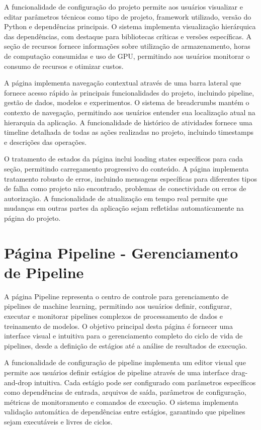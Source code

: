 \documentclass[12pt,a4paper]{article}
\begin{document}
A funcionalidade de configuração do projeto permite aos usuários visualizar e editar parâmetros técnicos como tipo de projeto, framework utilizado, versão do Python e dependências principais. O sistema implementa visualização hierárquica das dependências, com destaque para bibliotecas críticas e versões específicas. A seção de recursos fornece informações sobre utilização de armazenamento, horas de computação consumidas e uso de GPU, permitindo aos usuários monitorar o consumo de recursos e otimizar custos.

A página implementa navegação contextual através de uma barra lateral que fornece acesso rápido às principais funcionalidades do projeto, incluindo pipeline, gestão de dados, modelos e experimentos. O sistema de breadcrumbs mantém o contexto de navegação, permitindo aos usuários entender sua localização atual na hierarquia da aplicação. A funcionalidade de histórico de atividades fornece uma timeline detalhada de todas as ações realizadas no projeto, incluindo timestamps e descrições das operações.

O tratamento de estados da página inclui loading states específicos para cada seção, permitindo carregamento progressivo do conteúdo. A página implementa tratamento robusto de erros, incluindo mensagens específicas para diferentes tipos de falha como projeto não encontrado, problemas de conectividade ou erros de autorização. A funcionalidade de atualização em tempo real permite que mudanças em outras partes da aplicação sejam refletidas automaticamente na página do projeto.

\section{Página Pipeline - Gerenciamento de Pipeline}

A página Pipeline representa o centro de controle para gerenciamento de pipelines de machine learning, permitindo aos usuários definir, configurar, executar e monitorar pipelines complexos de processamento de dados e treinamento de modelos. O objetivo principal desta página é fornecer uma interface visual e intuitiva para o gerenciamento completo do ciclo de vida de pipelines, desde a definição de estágios até a análise de resultados de execução.

A funcionalidade de configuração de pipeline implementa um editor visual que permite aos usuários definir estágios de pipeline através de uma interface drag-and-drop intuitiva. Cada estágio pode ser configurado com parâmetros específicos como dependências de entrada, arquivos de saída, parâmetros de configuração, métricas de monitoramento e comandos de execução. O sistema implementa validação automática de dependências entre estágios, garantindo que pipelines sejam executáveis e livres de ciclos.
\end{document}
